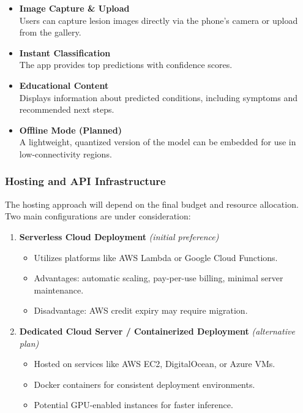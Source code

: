 \documentclass[
  12pt,
  oneside]{article}
\providecommand{\tightlist}{%
  \setlength{\itemsep}{0pt}\setlength{\parskip}{0pt}}
\begin{document}
\begin{itemize}
\tightlist
\item
  \textbf{Image Capture \& Upload}\\
  Users can capture lesion images directly via the phone's camera or
  upload from the gallery.
\item
  \textbf{Instant Classification}\\
  The app provides top predictions with confidence scores.
\item
  \textbf{Educational Content}\\
  Displays information about predicted conditions, including symptoms
  and recommended next steps.
\item
  \textbf{Offline Mode (Planned)}\\
  A lightweight, quantized version of the model can be embedded for use
  in low-connectivity regions.
\end{itemize}

\subsubsection{Hosting and API
Infrastructure}\label{hosting-and-api-infrastructure}

The hosting approach will depend on the final budget and resource
allocation. Two main configurations are under consideration:

\begin{enumerate}
\def\labelenumi{\arabic{enumi}.}
\item
  \textbf{Serverless Cloud Deployment} \emph{(initial preference)}

  \begin{itemize}
  \tightlist
  \item
    Utilizes platforms like AWS Lambda or Google Cloud Functions.\\
  \item
    Advantages: automatic scaling, pay-per-use billing, minimal server
    maintenance.\\
  \item
    Disadvantage: AWS credit expiry may require migration.
  \end{itemize}
\item
  \textbf{Dedicated Cloud Server / Containerized Deployment}
  \emph{(alternative plan)}

  \begin{itemize}
  \tightlist
  \item
    Hosted on services like AWS EC2, DigitalOcean, or Azure VMs.\\
  \item
    Docker containers for consistent deployment environments.\\
  \item
    Potential GPU-enabled instances for faster inference.
  \end{itemize}
\end{enumerate}
\end{document}
